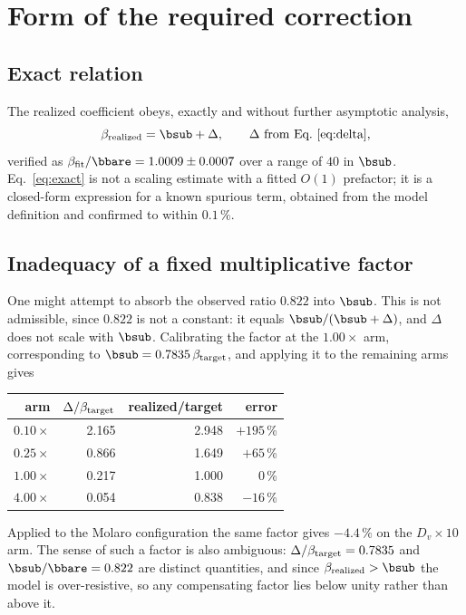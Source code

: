 \section{Form of the required correction}\label{sec:fix}

\subsection{Exact relation}
The realized coefficient obeys, exactly and without further asymptotic analysis,
\begin{equation}
\beta_{\rm realized}=\bsub+\Delta ,\qquad \Delta \text{ from Eq.~\eqref{eq:delta}},
\label{eq:exact}
\end{equation}
verified as $\beta_{\rm fit}/\bbare=1.0009\pm0.0007$ over a range of $40$ in $\bsub$.
Eq.~\eqref{eq:exact} is not a scaling estimate with a fitted $O(1)$ prefactor; it is a
closed-form expression for a known spurious term, obtained from the model definition and
confirmed to within $0.1\,\%$.

\subsection{Inadequacy of a fixed multiplicative factor}
One might attempt to absorb the observed ratio $0.822$ into $\bsub$. This is not
admissible, since $0.822$ is not a constant: it equals $\bsub/(\bsub+\Delta)$, and $\Delta$
does not scale with $\bsub$. Calibrating the factor at the $1.00\times$ arm, corresponding
to $\bsub=0.7835\,\beta_{\rm target}$, and applying it to the remaining arms gives
\begin{center}\small\begin{tabular}{rrrr}\toprule
arm & $\Delta/\beta_{\rm target}$ & realized/target & error\\ \midrule
$0.10\times$ & 2.165 & 2.948 & $+195$\,\%\\
$0.25\times$ & 0.866 & 1.649 & $+65$\,\%\\
$1.00\times$ & 0.217 & 1.000 & $0$\,\%\\
$4.00\times$ & 0.054 & 0.838 & $-16$\,\%\\ \bottomrule
\end{tabular}\end{center}
Applied to the Molaro configuration the same factor gives $-4.4\,\%$ on the
$D_v\!\times\!10$ arm. The sense of such a factor is also ambiguous:
$\Delta/\beta_{\rm target}=0.7835$ and $\bsub/\bbare=0.822$ are distinct quantities, and
since $\beta_{\rm realized}>\bsub$ the model is over-resistive, so any compensating factor
lies below unity rather than above it.


